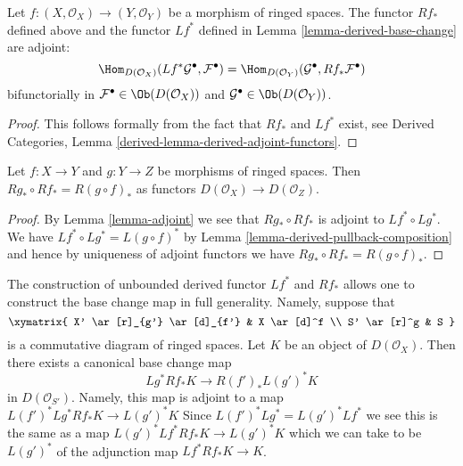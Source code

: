\begin{lemma}
\label{lemma-adjoint}
Let $f : (X, \mathcal{O}_X) \to (Y, \mathcal{O}_Y)$ be a morphism of
ringed spaces. The functor $Rf_*$ defined above and the functor $Lf^*$
defined in Lemma \ref{lemma-derived-base-change} are adjoint:
$$
\Hom_{D(\mathcal{O}_X)}(Lf^*\mathcal{G}^\bullet, \mathcal{F}^\bullet)
=
\Hom_{D(\mathcal{O}_Y)}(\mathcal{G}^\bullet, Rf_*\mathcal{F}^\bullet)
$$
bifunctorially in $\mathcal{F}^\bullet \in \Ob(D(\mathcal{O}_X))$ and
$\mathcal{G}^\bullet \in \Ob(D(\mathcal{O}_Y))$.
\end{lemma}

\begin{proof}
This follows formally from the fact that $Rf_*$ and $Lf^*$ exist, see
Derived Categories, Lemma \ref{derived-lemma-derived-adjoint-functors}.
\end{proof}

\begin{lemma}
\label{lemma-derived-pushforward-composition}
Let $f : X \to Y$ and $g : Y \to Z$ be morphisms of ringed spaces.
Then $Rg_* \circ Rf_* = R(g \circ f)_*$ as functors
$D(\mathcal{O}_X) \to D(\mathcal{O}_Z)$.
\end{lemma}

\begin{proof}
By Lemma \ref{lemma-adjoint} we see that $Rg_* \circ Rf_*$
is adjoint to $Lf^* \circ Lg^*$. We have
$Lf^* \circ Lg^* = L(g \circ f)^*$ by
Lemma \ref{lemma-derived-pullback-composition}
and hence by
uniqueness of adjoint functors we have $Rg_* \circ Rf_* = R(g \circ f)_*$.
\end{proof}

\begin{remark}
\label{remark-base-change}
The construction of unbounded derived functor $Lf^*$ and $Rf_*$
allows one to construct the base change map in full generality.
Namely, suppose that
$$
\xymatrix{
X' \ar[r]_{g'} \ar[d]_{f'} &
X \ar[d]^f \\
S' \ar[r]^g &
S
}
$$
is a commutative diagram of ringed spaces. Let $K$ be an object of
$D(\mathcal{O}_X)$. Then there exists a canonical base change
map
$$
Lg^*Rf_*K \longrightarrow R(f')_*L(g')^*K
$$
in $D(\mathcal{O}_{S'})$. Namely, this map is adjoint to a map
$L(f')^*Lg^*Rf_*K \to L(g')^*K$
Since $L(f')^*Lg^* = L(g')^*Lf^*$ we see this is the same as a map
$L(g')^*Lf^*Rf_*K \to L(g')^*K$
which we can take to be $L(g')^*$ of the adjunction map
$Lf^*Rf_*K \to K$.
\end{remark}

